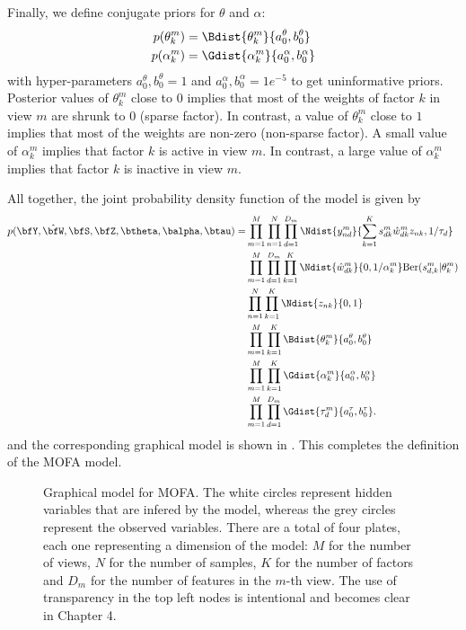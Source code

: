 Finally, we define conjugate priors for $\theta$ and $\alpha$:
\begin{align}
	p(\theta_k^m) &= \Bdist{\theta_k^m}{a_0^\theta,b_0^\theta}\\
	p(\alpha_k^m) &= \Gdist{\alpha_k^m}{a_0^\alpha, b_0^\alpha}
\end{align}
with hyper-parameters $a_0^\theta,b_0^\theta =1$ and $a_0^\alpha, b_0^\alpha=1e^{-5}$ to get uninformative priors. Posterior values of $\theta_k^m$ close to $0$ implies that most of the weights of factor $k$ in view $m$ are shrunk to $0$ (sparse factor). In contrast, a value of $\theta_k^m$ close to $1$ implies that most of the weights are non-zero (non-sparse factor). A small value of $\alpha_k^m$ implies that factor $k$ is active in view $m$. In contrast, a large value of $\alpha_k^m$ implies that factor $k$ is inactive in view $m$.

All together, the joint probability density function of the model is given by
\begin{align}
	\begin{split}
	p(\bfY,\hat{\bfW},\bfS,\bfZ,\btheta, \balpha, \btau)  = &\prod_{m=1}^{M} \prod_{n=1}^{N} \prod_{d=1}^{D_m} \Ndist{y_{nd}^m}{\sum_{k=1}^{K} s_{dk}^m \hat{w}_{dk}^m z_{nk},1/\tau_d} \\
	& \prod_{m=1}^{M}\prod_{d=1}^{D_m} \prod_{k=1}^{K} \Ndist{\hat{w}_{dk}^m}{0,1/\alpha_k^m} \text{Ber}(s_{d,k}^m|\theta_k^m) \\
	& \prod_{n=1}^{N} \prod_{k=1}^{K} \Ndist{z_{nk}}{0,1} \\
	& \prod_{m=1}^{M} \prod_{k=1}^{K} \Bdist{\theta_k^m}{a_0^\theta,b_0^\theta} \\
	& \prod_{m=1}^{M} \prod_{k=1}^{K} \Gdist{\alpha_k^m}{a_0^\alpha, b_0^\alpha} \\
	& \prod_{m=1}^{M} \prod_{d=1}^{D_m} \Gdist{\tau_d^m}{a_0^\tau,b_0^\tau}.
	\label{likelihood}
	\end{split}
\end{align}
and the corresponding graphical model is shown in . This completes the definition of the MOFA model.

\begin{figure}[H]
	\centering
	
	\caption{Graphical model for MOFA. The white circles represent hidden variables that are infered by the model, whereas the grey circles represent the observed variables. There are a total of four plates, each one representing a dimension of the model: $M$ for the number of views, $N$ for the number of samples, $K$ for the number of factors and $D_m$ for the number of features in the $m$-th view. The use of transparency in the top left nodes is intentional and becomes clear in Chapter 4.}
	\label{fig:MOFA_graphical_model}
\end{figure}

